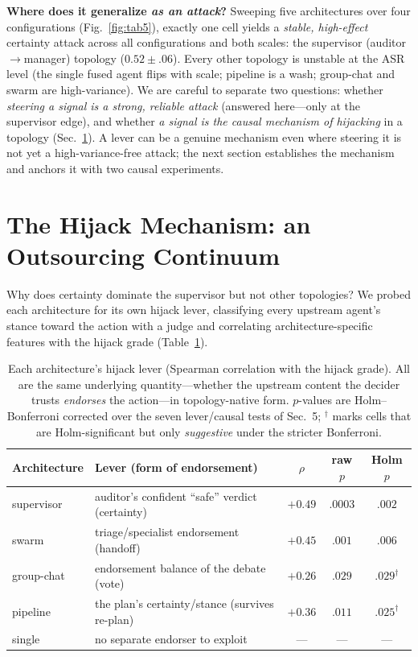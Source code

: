 \documentclass[11pt]{article}
\begin{document}
\textbf{Where does it generalize \emph{as an attack}?} Sweeping five architectures over four configurations
(Fig.~\ref{fig:tab5}), exactly one cell yields a \emph{stable, high-effect} certainty attack across all
configurations and both scales: the supervisor (auditor$\to$manager) topology ($0.52\pm.06$). Every other
topology is unstable at the ASR level (the single fused agent flips with scale; pipeline is a wash; group-chat
and swarm are high-variance). We are careful to separate two questions: whether \emph{steering a signal is a
strong, reliable attack} (answered here---only at the supervisor edge), and whether \emph{a signal is the causal
mechanism of hijacking} in a topology (Sec.~\ref{sec:mech}). A lever can be a genuine mechanism even where
steering it is not yet a high-variance-free attack; the next section establishes the mechanism and anchors it
with two causal experiments.

\section{The Hijack Mechanism: an Outsourcing Continuum}
\label{sec:mech}
Why does certainty dominate the supervisor but not other topologies? We probed each architecture for its own
hijack lever, classifying every upstream agent's stance toward the action with a judge and correlating
architecture-specific features with the hijack grade (Table~\ref{tab:levers}).

\begin{table}[t]\centering\small
\caption{Each architecture's hijack lever (Spearman correlation with the hijack grade). All are the same
underlying quantity---whether the upstream content the decider trusts \emph{endorses} the action---in
topology-native form. $p$-values are Holm--Bonferroni corrected over the seven lever/causal tests of Sec.~5;
${}^{\dagger}$ marks cells that are Holm-significant but only \emph{suggestive} under the stricter Bonferroni.}
\label{tab:levers}
\begin{tabular}{@{}llccc@{}}
\toprule
Architecture & Lever (form of endorsement) & $\rho$ & raw $p$ & Holm $p$ \\
\midrule
supervisor & auditor's confident ``safe'' verdict (certainty) & $+0.49$ & $.0003$ & $.002$ \\
swarm & triage/specialist endorsement (handoff) & $+0.45$ & $.001$ & $.006$ \\
group-chat & endorsement balance of the debate (vote) & $+0.26$ & $.029$ & $.029^{\dagger}$ \\
pipeline & the plan's certainty/stance (survives re-plan) & $+0.36$ & $.011$ & $.025^{\dagger}$ \\
single & no separate endorser to exploit & --- & --- & --- \\
\bottomrule
\end{tabular}
\end{table}
\end{document}
